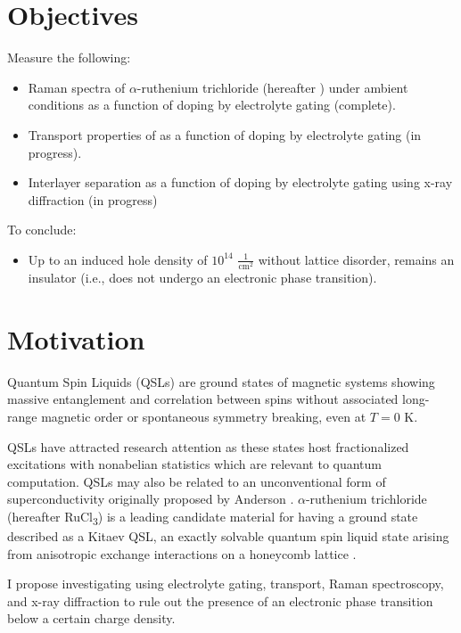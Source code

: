 \documentclass[11pt]{article}
\begin{document}
\section{Objectives}
Measure the following:
\begin{itemize}
	\item Raman spectra of $\alpha$-ruthenium trichloride (hereafter \rucl) under ambient conditions as a function of doping by electrolyte gating (complete).
	\item Transport properties of \rucl as a function of doping by electrolyte gating (in progress).
	\item Interlayer separation as a function of doping by electrolyte gating using x-ray diffraction (in progress)
\end{itemize}
To conclude:
\begin{itemize}
	\item Up to an induced hole density of $10^{14}$ $\frac{1}{\text{cm}^2}$ without lattice disorder, \rucl remains an insulator (i.e., does not undergo an electronic phase transition).
\end{itemize}

\section{Motivation}
Quantum Spin Liquids (QSLs) are ground states of magnetic systems showing massive entanglement and correlation between spins without associated long-range magnetic order or spontaneous symmetry breaking, even at $T = 0$ K. 

QSLs have attracted research attention as these states host fractionalized excitations with nonabelian statistics \cite{Balents2010} which are relevant to quantum computation. QSLs may also be related to an unconventional form of superconductivity originally proposed by Anderson \cite{Lee2008}. $\alpha$-ruthenium trichloride (hereafter RuCl\textsubscript{3}) is a leading candidate material for having a ground state described as a Kitaev QSL, an exactly solvable quantum spin liquid state arising from anisotropic exchange interactions on a honeycomb lattice \cite{Kitaev2006}.

I propose investigating \rucl using electrolyte gating, transport, Raman spectroscopy, and x-ray diffraction to rule out the presence of an electronic phase transition below a certain charge density.
\end{document}
